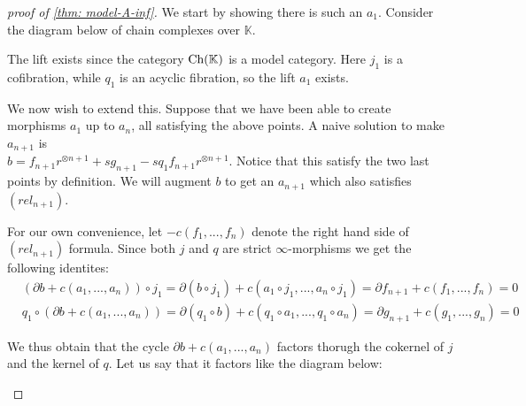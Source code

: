 \documentclass[../thesis.tex]{subfiles}
\begin{document}
\begin{proof}[proof of \ref{thm: model-A-inf}]
            We start by showing there is such an $a_1$. Consider the diagram below of chain complexes over $\mathbb{K}$.
            \begin{center}
            \end{center}
            The lift exists since the category $\tt{Ch}(\mathbb{K})$ is a model category. Here $j_1$ is a cofibration, while $q_1$ is an acyclic fibration, so the lift $a_1$ exists.

            We now wish to extend this. Suppose that we have been able to create morphisms $a_1$ up to $a_n$, all satisfying the above points. A naive solution to make $a_{n+1}$ is \\ $b = f_{n+1}r^{\otimes n+1} + sg_{n+1} - s q_1f_{n+1}r^{\otimes n+1}$. Notice that this satisfy the two last points by definition. We will augment $b$ to get an $a_{n+1}$ which also satisfies $(rel_{n+1})$.

            For our own convenience, let $-c(f_1, ..., f_n)$ denote the right hand side of $(rel_{n+1})$ formula. Since both $j$ and $q$ are strict $\infty$-morphisms we get the following identites:
            \begin{align*}
                & (\partial b + c(a_1, ..., a_n)) \circ j_1 = \partial (b\circ j_1) + c(a_1 \circ j_1, ..., a_n \circ j_1) = \partial f_{n+1} + c(f_1, ..., f_n) = 0 \\
                & q_1 \circ (\partial b + c(a_1, ..., a_n)) = \partial (q_1\circ b) + c(q_1\circ a_1, ..., q_1\circ a_n) = \partial {g_{n+1}} + c(g_1, ..., g_n) = 0
            \end{align*}

            We thus obtain that the cycle $\partial b + c(a_1, ..., a_n)$ factors thorugh the cokernel of $j$ and the kernel of $q$. Let us say that it factors like the diagram below:
            \begin{center}
            \end{center}


\end{proof}
\end{document}
